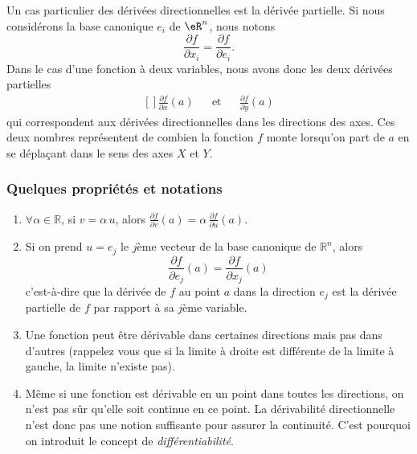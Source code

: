 Un cas particulier des dérivées directionnelles est la dérivée partielle. Si nous considérons la base canonique $e_i$ de $\eR^n$, nous notons
\begin{equation}
    \frac{ \partial f }{ \partial x_i }=\frac{ \partial f }{ \partial e_i }.
\end{equation}
Dans le cas d'une fonction à deux variables, nous avons donc les deux dérivées partielles
\begin{equation}
    \begin{aligned}[]
        \frac{ \partial f }{ \partial x }(a)&&\text{et}&&\frac{ \partial f }{ \partial y }(a)
    \end{aligned}
\end{equation}
qui correspondent aux dérivées directionnelles dans les directions des axes. Ces deux nombres représentent de combien la fonction $f$ monte lorsqu'on part de $a$ en se déplaçant dans le sens des axes $X$ et $Y$.

                    \subsubsection{Quelques propriétés et notations}

\begin{enumerate}
\item
 $\forall \alpha \in \mathbb{R}$,
si $v = \alpha\,u$, alors $\frac{\partial f}{\partial v}(a) =
\alpha\,\frac{\partial f}{\partial u}(a)$.
\item Si on prend $u=e_j$ le $j$ème vecteur de la base canonique de
$\mathbb{R}^n$, alors
$$\frac{\partial f}{\partial e_j}(a) = \frac{\partial f}{\partial
x_j}(a)$$ c'est-à-dire que la dérivée de $f$ au point $a$ dans la
direction $e_j$ est la dérivée partielle de $f$ par rapport à sa
$j$ème variable.

\item
Une fonction peut être dérivable dans certaines directions
mais pas dans d'autres (rappelez vous que si la limite à droite est
différente de la limite à gauche, la limite n'existe pas).

\item
Même si une fonction est dérivable en un point dans toutes les
directions, on n'est pas sûr qu'elle soit continue en ce point. La
dérivabilité directionnelle n'est donc pas une notion suffisante
pour assurer la continuité. C'est pourquoi on introduit le concept
de \emph{différentiabilité}.
\end{enumerate}

